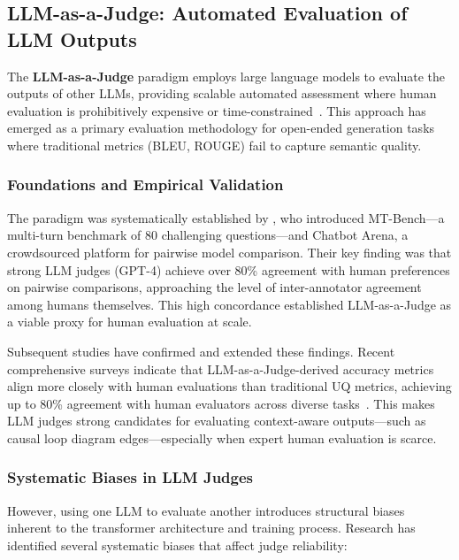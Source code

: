 
\subsection{LLM-as-a-Judge: Automated Evaluation of LLM Outputs}
\label{sec:lit_llm_as_judge}

The \textbf{LLM-as-a-Judge} paradigm employs large language models to evaluate the outputs of other LLMs, providing scalable automated assessment where human evaluation is prohibitively expensive or time-constrained~\citep{zheng2024judging}. This approach has emerged as a primary evaluation methodology for open-ended generation tasks where traditional metrics (BLEU, ROUGE) fail to capture semantic quality.

\subsubsection{Foundations and Empirical Validation}

The paradigm was systematically established by \citet{zheng2024judging}, who introduced MT-Bench---a multi-turn benchmark of 80 challenging questions---and Chatbot Arena, a crowdsourced platform for pairwise model comparison. Their key finding was that strong LLM judges (GPT-4) achieve over 80\% agreement with human preferences on pairwise comparisons, approaching the level of inter-annotator agreement among humans themselves. This high concordance established LLM-as-a-Judge as a viable proxy for human evaluation at scale.

Subsequent studies have confirmed and extended these findings. Recent comprehensive surveys indicate that LLM-as-a-Judge-derived accuracy metrics align more closely with human evaluations than traditional UQ metrics, achieving up to 80\% agreement with human evaluators across diverse tasks~\citep{li2024llmsjudges}. This makes LLM judges strong candidates for evaluating context-aware outputs---such as causal loop diagram edges---especially when expert human evaluation is scarce.

\subsubsection{Systematic Biases in LLM Judges}

However, using one LLM to evaluate another introduces structural biases inherent to the transformer architecture and training process. Research has identified several systematic biases that affect judge reliability:

